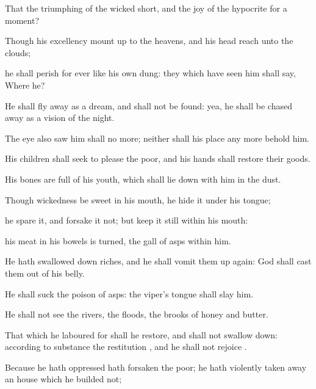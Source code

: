 {That the
triumphing of the
wicked
{}
short, and the
joy of the
hypocrite
{} for a
moment?

Though his
excellency mount
up to the
heavens, and his
head
reach unto the
clouds;

 he shall
perish for
ever like his own
dung: they which have
seen him shall
say,
Where
{} he?

He shall fly
away as a
dream, and shall not be
found: yea, he shall be chased
away as a
vision of the
night.

The
eye also
{}
saw him shall
{} no
more; neither shall his
place any more
behold him.


\par }{\PP {}His
children shall seek to
please the
poor, and his
hands shall
restore their
goods.

His
bones are
full
{} of his
youth, which shall lie
down with him in the
dust.

Though
wickedness be
sweet in his
mouth,
{} he
hide it under his
tongue;

 he
spare it, and
forsake it not; but keep it
still
within his
mouth:

 his
meat in his
bowels is
turned,
{} the
gall of
asps
within him.

He hath swallowed
down
riches, and he shall vomit them up
again:
God shall cast them
out of his
belly.

He shall
suck the
poison of
asps: the
viper’s
tongue shall
slay him.

He shall not
see the
rivers, the
floods, the
brooks of
honey and
butter.

That which he
laboured for shall he
restore, and shall not swallow
{}
down: according to
{}
substance
{} the
restitution
{}, and he shall not
rejoice
{}.

Because he hath
oppressed
{} hath
forsaken the
poor;
{} he hath violently taken
away an
house which he
builded not;

}

